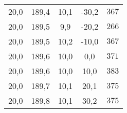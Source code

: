 \begin{table}
\begin{tabular}{S[table-format=2.1] S S[table-format=2.1] S S}
          {20,0 } & {189,4}  & 10,1 &  -30,2 & {$367$}  \\
          {20,0 } & {189,5}  &  9,9 &  -20,2 & {$266$}  \\
          {20,0 } & {189,5}  & 10,2 &  -10,0 & {$367$}  \\
          {20,0 } & {189,6}  & 10,0 &    0,0 & {$371$}  \\
          {20,0 } & {189,6}  & 10,0 &   10,0 & {$383$}  \\
          {20,0 } & {189,7}  & 10,1 &   20,1 & {$375$}  \\
          {20,0 } & {189,8}  & 10,1 &   30,2 & {$375$}  \\
      \bottomrule
    \end{tabular}
\end{table}

 
  
  
 
  
  
  
 
  
  
 
 
  
  
  
 
  
 
 
 
 
 